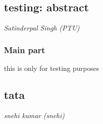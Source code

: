  


\label{7}

\subsection*{testing: abstract}
\textit{Satinderpal Singh (PTU)}

% 



\subsubsection*{Main part}

this is only for testing purposes




 


\label{11}

\subsection*{tata}
\textit{snehi kumar (snehi)}

% 



